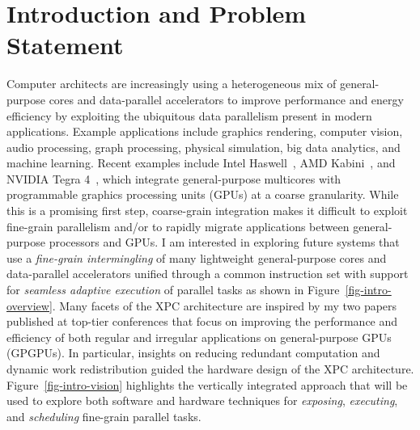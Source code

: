 
\section{Introduction and Problem Statement}
\label{sec-intro}


Computer architects are increasingly using a heterogeneous mix of
general-purpose cores and data-parallel accelerators to improve
performance and energy efficiency by exploiting the ubiquitous data
parallelism present in modern applications. Example applications include
graphics rendering, computer vision, audio processing, graph processing,
physical simulation, big data analytics, and machine learning. Recent
examples include Intel
Haswell~\cite{hammarlund-intel-haswell-ieeemicro2014}, AMD
Kabini~\cite{bouvier-amd-kabini-ieeemicro2014}, and NVIDIA Tegra
4~\cite{krewell-nvidia-tegra4-mpr2013}, which integrate general-purpose
multicores with programmable graphics processing units (GPUs) at a coarse
granularity. While this is a promising first step, coarse-grain
integration makes it difficult to exploit fine-grain parallelism and/or
to rapidly migrate applications between general-purpose processors and
GPUs. I am interested in exploring future systems that use a
\emph{fine-grain intermingling} of many lightweight general-purpose cores
and data-parallel accelerators unified through a common instruction set
with support for \emph{seamless adaptive execution} of parallel tasks as
shown in Figure~\ref{fig-intro-overview}.    Many facets of the XPC architecture are inspired by my two
papers published at top-tier conferences that focus on improving the
performance and efficiency of both regular and irregular applications on
general-purpose GPUs (GPGPUs). In particular, insights on reducing
redundant computation and dynamic work redistribution guided the hardware
design of the XPC architecture.  Figure~\ref{fig-intro-vision} highlights
the vertically integrated approach that will be used to explore both
software and hardware techniques for \emph{exposing}, \emph{executing},
and \emph{scheduling} fine-grain parallel tasks.

